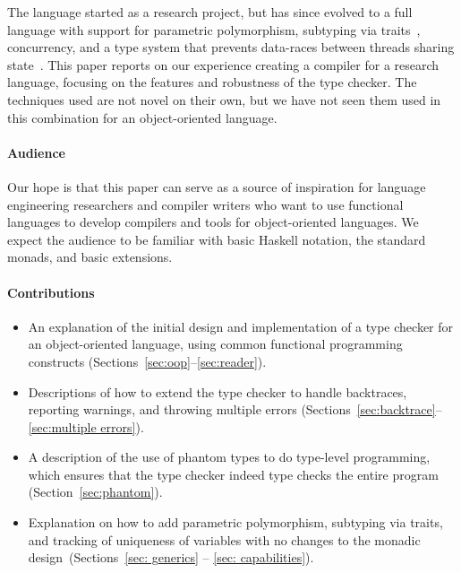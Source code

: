 \documentclass[sigplan,screen]{acmart}
\newcommand{\RED}[1]{\textcolor{red}{#1}}
\begin{document}
The language started as a research project, but has since
evolved to a full language with support for parametric polymorphism, subtyping
via traits~\cite{traits}, concurrency, and a type system that
prevents data-races between threads sharing state~\cite{Kappa}.
This paper reports on our experience creating a compiler for
a research language, focusing on the features and
robustness of the type checker. The techniques
used are not novel on their own, but we have not seen them used in
this combination for an object-oriented language.
%

\paragraph{Audience}
Our hope is that this paper can serve as a source of inspiration for language engineering researchers and
compiler writers who want to use functional languages to develop compilers
and tools for object-oriented languages. We expect the audience
to be familiar with basic Haskell notation, the standard monads, and
basic extensions.

\paragraph{Contributions} %

\begin{itemize}
\item
  An explanation of the initial design and
  implementation of a type checker for an object-oriented language, using common
  functional programming constructs
  (Sections~\ref{sec:oop}--\ref{sec:reader}).
\item Descriptions of how to extend the type checker to handle
  backtraces, reporting warnings, and throwing multiple errors
  (Sections~\ref{sec:backtrace}--\ref{sec:multiple errors}).
\item A description of the use of phantom types to do type-level programming,
  which ensures that the
  type checker indeed type checks the entire program
  (Section~\ref{sec:phantom}).
\item Explanation on how to add parametric polymorphism, subtyping via traits, and
  tracking of uniqueness of variables with no changes to the
  monadic design~(Sections~\ref{sec: generics} -- \ref{sec: capabilities}).
\end{itemize}
\end{document}
